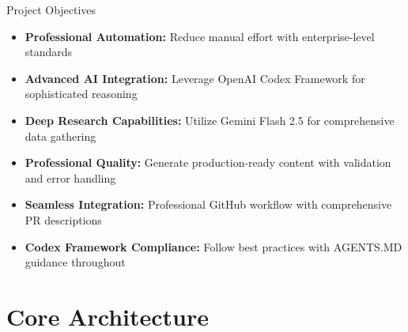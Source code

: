 \documentclass{beamer}
\begin{document}
\begin{frame}{Project Objectives}
    \begin{itemize}
        \item \textbf{Professional Automation:} Reduce manual effort with enterprise-level standards
        \item \textbf{Advanced AI Integration:} Leverage OpenAI Codex Framework for sophisticated reasoning
        \item \textbf{Deep Research Capabilities:} Utilize Gemini Flash 2.5 for comprehensive data gathering
        \item \textbf{Professional Quality:} Generate production-ready content with validation and error handling
        \item \textbf{Seamless Integration:} Professional GitHub workflow with comprehensive PR descriptions
        \item \textbf{Codex Framework Compliance:} Follow best practices with AGENTS.MD guidance throughout
    \end{itemize}
\end{frame}

\section{Core Architecture} \label{L_section_architecture}
\end{document}
